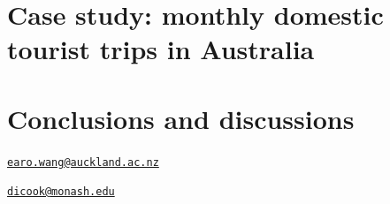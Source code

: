 \hypertarget{case-study-monthly-domestic-tourist-trips-in-australia}{%
\section{Case study: monthly domestic tourist trips in
Australia}\label{case-study-monthly-domestic-tourist-trips-in-australia}}

\hypertarget{conclusions-and-discussions}{%
\section{Conclusions and
discussions}\label{conclusions-and-discussions}}



\address{%
Earo Wang\\
The University of Auckland\\
Department of Statistics\\ The Univerisity of Auckland\\ New Zealand\\
}
\href{mailto:earo.wang@auckland.ac.nz}{\nolinkurl{earo.wang@auckland.ac.nz}}

\address{%
Dianne Cook\\
Monash University\\
Department of Econometrics and Business Statistics\\ Monash University\\ Australia\\
}
\href{mailto:dicook@monash.edu}{\nolinkurl{dicook@monash.edu}}

